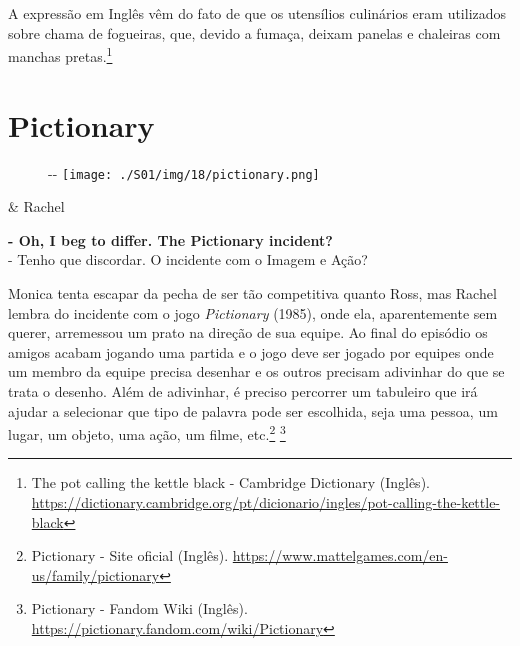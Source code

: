 A expressão em Inglês vêm do fato de que os utensílios culinários eram
utilizados sobre chama de fogueiras, que, devido a fumaça, deixam
panelas e chaleiras com manchas pretas.\footnote{\sloppy The pot calling the kettle black - Cambridge Dictionary (Inglês). \url{https://dictionary.cambridge.org/pt/dicionario/ingles/pot-calling-the-kettle-black}}

\hypertarget{pictionary}{%
\section{Pictionary}\label{pictionary}}

\begin{figure}[!ht]
  \begin{adjustwidth}{-\oddsidemargin-1in}{-\rightmargin}
    \centering
    \texttt{[image: ./S01/img/18/pictionary.png]}
  \end{adjustwidth}
\end{figure}

\begin{tcolorbox}[enhanced,center upper,
    drop fuzzy shadow southeast, boxrule=0.3pt,
    lower separated=false, breakable,
    colframe=black!30!dialogoBorder,colback=white]
\begin{minipage}[c]{0.16\linewidth}
   & \centering \scriptsize{Rachel}
\end{minipage}
\hfill
\begin{minipage}[c]{0.8\linewidth}
  \textbf{- Oh, I beg to differ. The Pictionary incident?}\\
  - Tenho que discordar. O incidente com o Imagem e Ação?
\end{minipage}
\end{tcolorbox}

Monica tenta escapar da pecha de ser tão competitiva quanto Ross, mas
Rachel lembra do incidente com o jogo \emph{Pictionary} (1985), onde
ela, aparentemente sem querer, arremessou um prato na direção de sua
equipe. Ao final do episódio os amigos acabam jogando uma partida e o
jogo deve ser jogado por equipes onde um membro da equipe precisa
desenhar e os outros precisam adivinhar do que se trata o desenho. Além
de adivinhar, é preciso percorrer um tabuleiro que irá ajudar a
selecionar que tipo de palavra pode ser escolhida, seja uma pessoa, um
lugar, um objeto, uma ação, um filme, etc.\footnote{\sloppy Pictionary - Site oficial (Inglês). \url{https://www.mattelgames.com/en-us/family/pictionary}}
\footnote{\sloppy Pictionary - Fandom Wiki (Inglês). \url{https://pictionary.fandom.com/wiki/Pictionary}}

